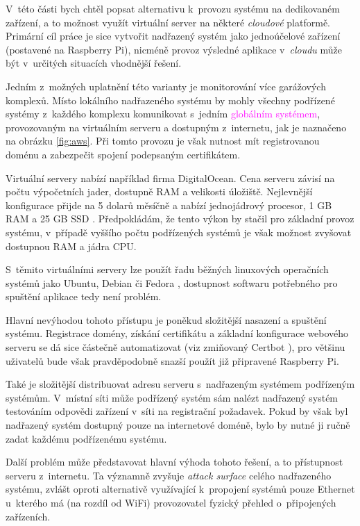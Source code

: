 V~této části bych chtěl popsat alternativu k~provozu systému na dedikovaném zařízení, a to možnost využít virtuální server na některé \textit{cloudové} platformě. Primární cíl práce je sice vytvořit nadřazený systém jako jednoúčelové zařízení (postavené na Raspberry Pi), nicméně provoz výsledné aplikace v~\textit{cloudu} může být v~určitých situacích vhodnější řešení.

Jedním z~možných uplatnění této varianty je monitorování více garážových komplexů. Místo lokálního nadřazeného systému by mohly všechny \textcolor{blue2}{podřízené systémy} z~každého komplexu komunikovat s~jedním \textcolor{magenta}{globálním systémem}, provozovaným na virtuálním serveru a dostupným z~internetu, jak je naznačeno na obrázku \ref{fig:aws}. Při tomto provozu je však nutnost mít registrovanou doménu a zabezpečit spojení podepsaným certifikátem.

Virtuální servery nabízí například firma DigitalOcean. Cena serveru závisí na počtu výpočetních jader, dostupně RAM a velikosti úložiště. Nejlevnější konfigurace přijde na 5 dolarů měsíčně a nabízí jednojádrový procesor, 1 GB RAM a 25 GB SSD \cite{digi_pricing}. Předpokládám, že tento výkon by stačil pro základní provoz systému, v~případě vyššího počtu podřízených systémů je však možnost zvyšovat dostupnou RAM a jádra CPU. 

S~těmito virtuálními servery lze použít řadu běžných linuxových operačních systémů jako Ubuntu, Debian či Fedora \cite{digi_droplets}, dostupnost softwaru potřebného pro spuštění aplikace tedy není problém.

Hlavní nevýhodou tohoto přístupu je poněkud složitější nasazení a spuštění systému. Registrace domény, získání certifikátu a základní konfigurace webového serveru se dá sice částečně automatizovat (viz zmiňovaný Certbot \cite{certbot}), pro většinu uživatelů bude však pravděpodobně snazší použít již připravené Raspberry Pi.

Také je složitější distribuovat adresu serveru s~nadřazeným systémem podřízeným systémům. V~místní síti může podřízený systém sám nalézt nadřazený systém testováním odpovědi zařízení v~síti na registrační požadavek. Pokud by však byl nadřazený systém dostupný pouze na internetové doméně, bylo by nutné ji ručně zadat každému podřízenému systému.

Další problém může představovat hlavní výhoda tohoto řešení, a to přístupnost serveru z~internetu. Ta významně zvyšuje \textit{attack surface} celého nadřazeného systému, zvlášt oproti alternativě využívající k~propojení systémů pouze Ethernet u~kterého má (na rozdíl od WiFi) provozovatel fyzický přehled o~připojených zařízeních.

